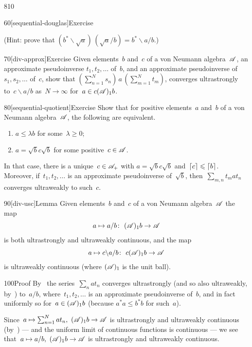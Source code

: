 \begin{parsec}{810}
\begin{point}{60}[sequential-douglas]{Exercise}
\begin{enumerate}
(Hint: prove that $(b^*\backslash \sqrt{a})\,(\sqrt{a}/b)
= b^*\backslash a/b$.)
\end{enumerate}%
\spacingfix%
\end{point}%
\begin{point}{70}[div-approx]{Exercise}%
Given elements~$b$ and~$c$ of a von Neumann algebra~$\mathscr{A}$,
an approximate pseudoinverse $t_1,t_2,\dotsc$
of~$b$,
and an approximate pseudoinverse of~$s_1,s_2,\dotsc$
of~$c$,
show that
$(\sum_{n=1}^N s_n) \,a\, (\sum_{m=1}^Nt_m)$,
converges ultrastrongly to~$c\backslash a /b$%
as~$N\to\infty$
for~$a\in c(\mathscr{A})_1 b$.
\end{point}
\begin{point}{80}[sequential-quotient]{Exercise}%
Show that for positive elements~$a$ and~$b$ of a von Neumann
algebra~$\mathscr{A}$,
the following are equivalent.
\begin{enumerate}
\item
$a\leq \lambda b$ for some~$\lambda\geq 0$;
\item
$a=\sqrt{b}c\sqrt{b}$
for some positive~$c\in\mathscr{A}$.
\end{enumerate}
In that case, there is a unique~$c\in\mathscr{A}_+$
with $a=\sqrt{b}c\sqrt{b}$
and~$\left\lceil c\right\rceil\leqslant \left\lceil b\right\rceil$.
Moreover,
if~$t_1,t_2,\dotsc$
is an approximate pseudoinverse of~$\sqrt{b}$,
then~$\sum_{m,n} t_m a t_n$
converges ultraweakly to such~$c$.
\end{point}
\begin{point}{90}[div-usc]{Lemma}%
Given elements~$b$ and~$c$  of a von Neumann algebra~$\mathscr{A}$
the map
\begin{equation*}
	a\mapsto a/b\colon \  (\mathscr{A})_1b \to \mathscr{A}
\end{equation*}
is both ultrastrongly and ultraweakly continuous,
and the map
\begin{equation*}
a\mapsto c\backslash a/b\colon\  c(\mathscr{A})_1b\to \mathscr{A}
\end{equation*}
is ultraweakly continuous
(where $(\mathscr{A})_1$ is the unit ball).
\begin{point}{100}{Proof}%
By~
the series~$\sum_n at_n$ converges ultrastrongly
(and so also ultraweakly, by~)
to~$a/b$,
where~$t_1,t_2,\dotsc$
is an approximate pseudoinverse of~$b$,
and in fact uniformly so for~$a\in(\mathscr{A})_1 b$
(because $a^*a\leq b^*b$ for such~$a$).

Since~$a\mapsto \sum_{n=1}^N at_n,\ (\scrA)_1b\to\scrA$
is ultrastrongly and ultraweakly continuous (by~)
--- and the uniform limit of continuous functions is continuous ---
we see that~$a\mapsto a/b,
\ (\mathscr{A})_1b\to\mathscr{A}$ is ultrastrongly and ultraweakly continuous.


\end{point}
\end{point}
\end{parsec}
